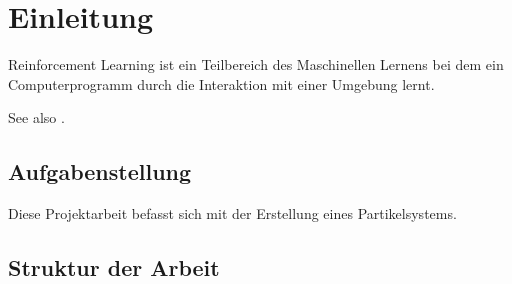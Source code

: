 \chapter{Einleitung}
\textmd{Reinforcement Learning ist ein Teilbereich des Maschinellen Lernens bei dem ein Computerprogramm durch die Interaktion mit einer Umgebung lernt.}

See also \cite{gamasutra2000}.

\section{Aufgabenstellung}
\textmd{Diese Projektarbeit befasst sich mit der Erstellung eines Partikelsystems.}

\section{Struktur der Arbeit}
\textmd{}
